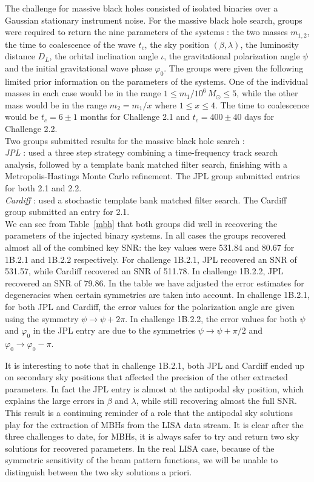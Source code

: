 \documentclass{iopart}
\begin{document}
The challenge for massive black holes consisted of isolated binaries over a Gaussian stationary instrument noise.  For the massive black hole search, groups were required to return the nine parameters of the systems : the two masses $m_{1,2}$, the time to coalescence of the wave $t_c$, the sky position $(\beta,\lambda)$, the luminosity distance $D_L$, the orbital inclination angle $\iota$, the gravitational polarization angle $\psi$ and the initial gravitational wave phase $\varphi_0$.  The groups were given the following limited prior information on the parameters of the systems.  One of the individual masses in each case would be in the range $1\leq m_1/10^6\,M_{\odot}\leq 5$, while the other mass would be in the range $m_2=m_1/x$ where $1\leq x\leq 4$.  The time to coalescence  would be $t_c = 6\pm 1$ months for Challenge 2.1 and $t_c=400\pm40$ days for Challenge 2.2.\\


\noindent Two groups submitted results for the massive black hole search :\\

\noindent\emph{ JPL} : used a three step strategy combining a time-frequency track search analysis, followed by a template bank matched filter search, finishing with a Metropolis-Hastings Monte Carlo refinement.  The JPL group submitted entries for both 2.1 and 2.2.\\
\emph{ Cardiff} : used a stochastic template bank matched filter search\cite{cardiffmbh}.  The Cardiff group submitted an entry for 2.1.\\

We can see from Table~\ref{mbh} that both groups did well in recovering the parameters of the injected binary systems.  In all cases the groups recovered almost all of the combined key SNR: the key values were 531.84 and 80.67 for 1B.2.1 and 1B.2.2 respectively.  For challenge 1B.2.1, JPL recovered an SNR of 531.57, while Cardiff recovered an SNR of 511.78.  In challenge 1B.2.2, JPL recovered an SNR of 79.86.  In the table we have adjusted the error estimates for degeneracies when certain symmetries are taken into account.  In challenge 1B.2.1, for both JPL and Cardiff, the error values for the polarization angle are given using the symmetry $\psi\rightarrow\psi+2\pi$.  In challenge 1B.2.2, the error values for both $\psi$ and $\varphi_0$ in the JPL entry are due to the symmetries $\psi\rightarrow\psi+\pi/2$ and $\varphi_0\rightarrow\varphi_0-\pi$.  

It is interesting to note that in challenge 1B.2.1, both JPL and Cardiff ended up on secondary sky positions that affected the precision of the other extracted parameters.  In fact the JPL entry is almost at the antipodal sky position, which explains the large errors in $\beta$ and $\lambda$, while still recovering almost the full SNR.  This result is a continuing reminder of a role that the antipodal sky solutions play for the extraction of MBHs from the LISA data stream.  It is clear after the three challenges to date,  for MBHs, it is always safer to try and return two sky solutions for recovered parameters.  In the real LISA case, because of the symmetric sensitivity of the beam pattern functions, we will be unable to distinguish between the two sky solutions a priori.
\end{document}
